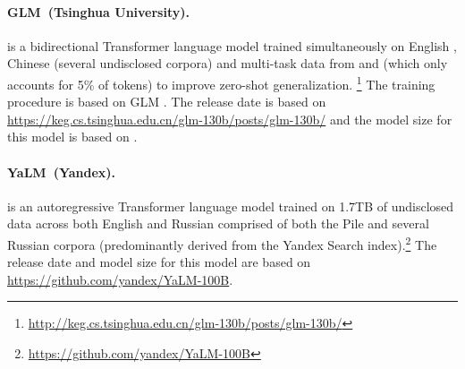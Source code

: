 \paragraph{GLM~(Tsinghua University).}
\glm \citep{zeng2022glm} is a bidirectional Transformer language model trained simultaneously on English \citep[the Pile][]{gao2021thepile}, Chinese (several undisclosed corpora) and multi-task data from \citet{sanh2021multitask} and \citet{wang2022deepstruct} (which only accounts for 5\% of tokens) to improve zero-shot generalization. \footnote{\url{http://keg.cs.tsinghua.edu.cn/glm-130b/posts/glm-130b/}} 
The training procedure is based on GLM \citep{du2022glm}. 
The release date is based on \url{https://keg.cs.tsinghua.edu.cn/glm-130b/posts/glm-130b/} and the model size for this model is based on \citet{zeng2022glm}.

\paragraph{YaLM~(Yandex).}
\yalm is an autoregressive Transformer language model trained on 1.7TB of undisclosed data across both English and Russian comprised of both the Pile \citep{gao2021thepile} and several Russian corpora (predominantly derived from the Yandex Search index).\footnote{\url{https://github.com/yandex/YaLM-100B}}
The release date and model size for this model are based on \url{https://github.com/yandex/YaLM-100B}.
